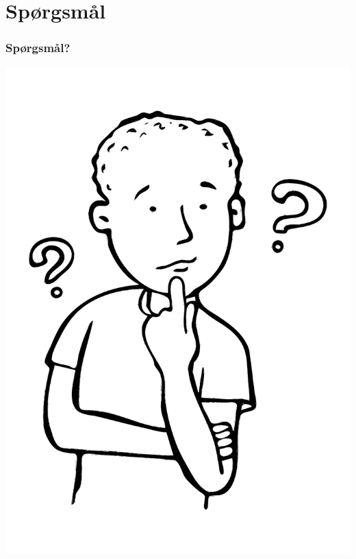 \section{Spørgsmål}
\begin{frame}
    \frametitle{\textbf{Spørgsmål?}}
    \vspace{-15mm}
    \begin{center}
        \includegraphics[scale=0.4]{./figs/Boy-asking-question.pdf}
    \end{center}
    \vspace{-25mm}
\end{frame}

